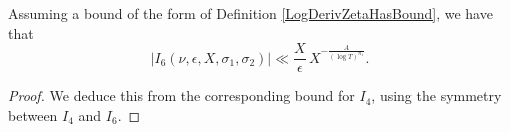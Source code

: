 \begin{lemma}[I6GenBound]
\label{I6GenBound}
\leanok
Assuming a bound of the form of Definition \ref{LogDerivZetaHasBound}, we have that
  $$
  \left|I_6(\nu,\epsilon,X,\sigma_1,\sigma_2)\right|
    \ll\frac{X}{\epsilon}\,X^{-\frac{A}{(\log T)^{n_1}}}.
  $$
\end{lemma}
\begin{proof}
\leanok
We deduce this from the corresponding bound for $I_4$, using the symmetry between $I_4$ and $I_6$.
\end{proof}
